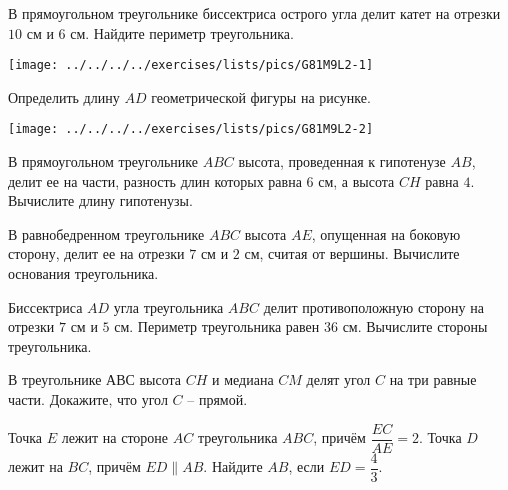 \begin{class}[number=2]
	\begin{listofex}
		\item 
		\begin{minipage}[t]{\bodywidth}
			В прямоугольном треугольнике биссектриса острого угла делит катет на отрезки \( 10 \) см и \( 6 \) см. Найдите периметр треугольника.
		\end{minipage}
		\hspace{0.02\linewidth}
		\begin{minipage}[t]{\picwidth}
			\texttt{[image: ../../../../exercises/lists/pics/G81M9L2-1]}
		\end{minipage}
	\item 
	\begin{minipage}[t]{\bodywidth}
		Определить длину \( AD\) геометрической фигуры на рисунке.
	\end{minipage}
	\hspace{0.02\linewidth}
	\begin{minipage}[t]{\picwidth}
		\texttt{[image: ../../../../exercises/lists/pics/G81M9L2-2]}
	\end{minipage}
	\item В прямоугольном треугольнике \( ABC \) высота, проведенная к гипотенузе \( AB \), делит ее на части, разность длин которых равна \( 6 \) см, а высота \( CH \) равна \( 4 \). Вычислите длину гипотенузы.
	\item В равнобедренном треугольнике \( ABC \) высота \( AE \), опущенная на боковую сторону, делит ее на отрезки \( 7 \) см и \( 2 \) см, считая от вершины. Вычислите основания треугольника.
	\item Биссектриса \( AD \) угла треугольника \( ABC \) делит противоположную сторону на отрезки \( 7 \) см и \( 5 \) см. Периметр треугольника равен \( 36 \) см. Вычислите стороны треугольника.
	\item В треугольнике АВС высота \( CH \) и медиана \( CM \) делят угол \( C \) на три равные части. Докажите, что угол \( C \) – прямой.
	\item Точка \( E \) лежит на стороне \( AC \) треугольника \( ABC \), причём \( \dfrac{EC}{AE} = 2 \). Точка \( D \) лежит на \( BC \), причём \( ED\parallel AB \). Найдите \( AB \), если \( ED = \dfrac{4}{3} \).
	\item 
	\begin{minipage}[t]{\bodywidth}

\end{minipage}
\end{listofex}
\end{class}
